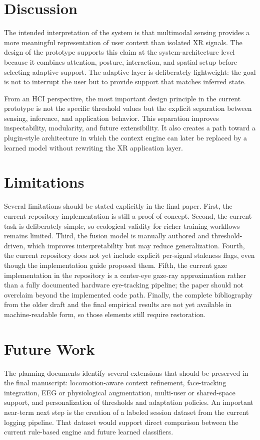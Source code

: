 \documentclass[10pt,twocolumn]{article}
\begin{document}
\section{Discussion}
The intended interpretation of the system is that multimodal sensing provides a more meaningful representation of user context than isolated XR signals. The design of the prototype supports this claim at the system-architecture level because it combines attention, posture, interaction, and spatial setup before selecting adaptive support. The adaptive layer is deliberately lightweight: the goal is not to interrupt the user but to provide support that matches inferred state.

From an HCI perspective, the most important design principle in the current prototype is not the specific threshold values but the explicit separation between sensing, inference, and application behavior. This separation improves inspectability, modularity, and future extensibility. It also creates a path toward a plugin-style architecture in which the context engine can later be replaced by a learned model without rewriting the XR application layer.

\section{Limitations}
Several limitations should be stated explicitly in the final paper. First, the current repository implementation is still a proof-of-concept. Second, the current task is deliberately simple, so ecological validity for richer training workflows remains limited. Third, the fusion model is manually authored and threshold-driven, which improves interpretability but may reduce generalization. Fourth, the current repository does not yet include explicit per-signal staleness flags, even though the implementation guide proposed them. Fifth, the current gaze implementation in the repository is a center-eye gaze-ray approximation rather than a fully documented hardware eye-tracking pipeline; the paper should not overclaim beyond the implemented code path. Finally, the complete bibliography from the older draft and the final empirical results are not yet available in machine-readable form, so those elements still require restoration.

\section{Future Work}
The planning documents identify several extensions that should be preserved in the final manuscript: locomotion-aware context refinement, face-tracking integration, EEG or physiological augmentation, multi-user or shared-space support, and personalization of thresholds and adaptation policies. An important near-term next step is the creation of a labeled session dataset from the current logging pipeline. That dataset would support direct comparison between the current rule-based engine and future learned classifiers.
\end{document}
